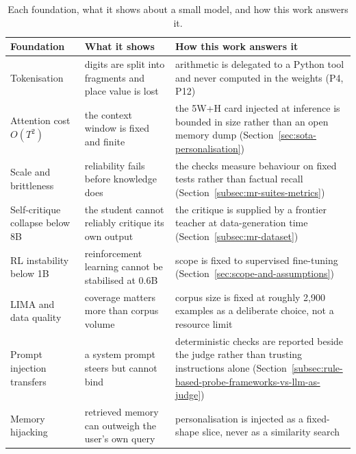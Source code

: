 \begin{table}[H]
  \centering\small
  \caption[Each foundation, what it shows about a small model, and how this work answers it]{Each foundation, what it shows about a small model, and how this work answers it.}
  \label{tab:foundation-payoff}
  \begin{tabular}{@{}p{3.5cm}p{5.3cm}p{6.4cm}@{}}
    \toprule
    Foundation & What it shows & How this work answers it \\
    \midrule
    Tokenisation & digits are split into fragments and place value is lost
      & arithmetic is delegated to a Python tool and never computed in the weights (P4, P12) \\
    \addlinespace
    Attention cost $O(T^{2})$ & the context window is fixed and finite
      & the 5W+H card injected at inference is bounded in size rather than an open memory dump (Section~\ref{sec:sota-personalisation}) \\
    \addlinespace
    Scale and brittleness & reliability fails before knowledge does
      & the checks measure behaviour on fixed tests rather than factual recall (Section~\ref{subsec:mr-suites-metrics}) \\
    \addlinespace
    Self-critique collapse below 8B & the student cannot reliably critique its own output
      & the critique is supplied by a frontier teacher at data-generation time (Section~\ref{subsec:mr-dataset}) \\
    \addlinespace
    RL instability below 1B & reinforcement learning cannot be stabilised at 0.6B
      & scope is fixed to supervised fine-tuning (Section~\ref{sec:scope-and-assumptions}) \\
    \addlinespace
    LIMA and data quality & coverage matters more than corpus volume
      & corpus size is fixed at roughly 2{,}900 examples as a deliberate choice, not a resource limit \\
    \addlinespace
    Prompt injection transfers & a system prompt steers but cannot bind
      & deterministic checks are reported beside the judge rather than trusting instructions alone (Section~\ref{subsec:rule-based-probe-frameworks-vs-llm-as-judge}) \\
    \addlinespace
    Memory hijacking & retrieved memory can outweigh the user's own query
      & personalisation is injected as a fixed-shape slice, never as a similarity search \\
    \bottomrule
  \end{tabular}
\end{table}


